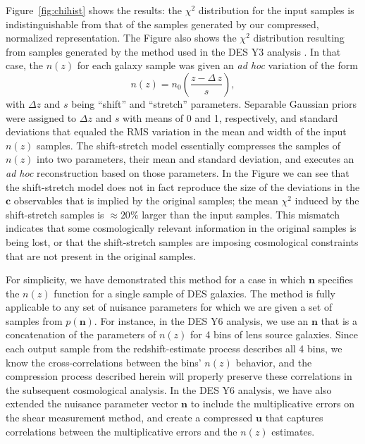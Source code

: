 \documentclass[onecolumn]{aastex7}
\newcommand{\vecc}{\ensuremath{\mathbf{c}}}
\newcommand{\vecn}{\ensuremath{\mathbf{n}}}
\newcommand{\vecu}{\ensuremath{\mathbf{u}}}
\begin{document}
Figure~\ref{fig:chihist} shows the results: the $\chi^2$ distribution
for the input samples is indistinguishable from that of the samples
generated by our compressed, normalized representation.
The Figure also shows the $\chi^2$ distribution resulting from samples
generated by the method used in the DES Y3 analysis \citep{y3pz}.  In
that case, the $n(z)$ for each galaxy sample was given an \textit{ad
  hoc} variation of the form
\begin{equation}
  n(z) = n_0\left(\frac{z-\Delta\,z}{s}\right),
  \label{eq:zs}
\end{equation}
with $\Delta z$ and $s$ being ``shift'' and ``stretch'' parameters.
Separable Gaussian priors were assigned to $\Delta z$ and $s$ with
means of 0 and 1, respectively, and standard deviations that equaled
the RMS variation in the mean and width of the input $n(z)$ samples.
The shift-stretch model essentially compresses the samples of $n(z)$
into two parameters, their mean and standard deviation, and executes
an \textit{ad hoc} reconstruction based on those parameters.
In the Figure we can see that the shift-stretch model does not in fact
reproduce the size of the deviations in the $\vecc$ observables that
is implied by the original samples; the mean $\chi^2$ induced by the
shift-stretch samples is $\approx20\%$ larger than the input samples.  
This mismatch indicates that some cosmologically relevant information in the
original samples is being lost, or that the shift-stretch samples are
imposing cosmological constraints that are not present in the original
samples.

For simplicity, we have demonstrated this method for a case in which
$\vecn$ specifies the $n(z)$ function for a single sample of DES
galaxies.  The method is fully applicable to any set of nuisance
parameters for which we are given a set of samples from $p(\vecn).$
For instance, in the DES Y6 analysis, we use an $\vecn$ that is a
concatenation of the parameters of $n(z)$ for 4 bins of lens source
galaxies.  Since each output sample from the  redshift-estimate
process describes all 4 bins, we know the cross-correlations between
the bins' $n(z)$ behavior, and the compression process described
herein will properly preserve these correlations in the subsequent
cosmological analysis.  In the DES Y6 analysis, we have also extended
the nuisance parameter vector $\vecn$ to include the multiplicative
errors on the shear measurement method, and create a compressed
$\vecu$ that captures correlations between the multiplicative errors
and the $n(z)$ estimates.
\end{document}
